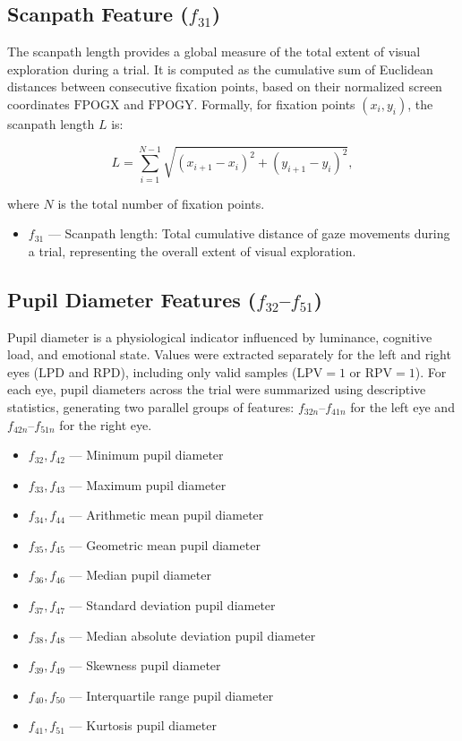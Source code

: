 \documentclass[12pt]{report}
\begin{document}
\subsection[Scanpath Feature (f31)]{Scanpath Feature (\(f_{31}\))}

The scanpath length provides a global measure of the total extent of visual exploration during a trial. 
It is computed as the cumulative sum of Euclidean distances between consecutive fixation points, based on their normalized screen coordinates \(\mathrm{FPOGX}\) and \(\mathrm{FPOGY}\). 
Formally, for fixation points \((x_i, y_i)\), the scanpath length \(L\) is:

\[
L = \sum_{i=1}^{N-1} \sqrt{(x_{i+1} - x_i)^2 + (y_{i+1} - y_i)^2},
\]

where \(N\) is the total number of fixation points. 

\begin{itemize}
    \item \(f_{31}\) — Scanpath length: Total cumulative distance of gaze movements during a trial, representing the overall extent of visual exploration.
\end{itemize}


\subsection[Pupil Diameter Features (f32–f51)]{Pupil Diameter Features (\(f_{32}\)–\(f_{51}\))}

Pupil diameter is a physiological indicator influenced by luminance, cognitive load, and emotional state. 
Values were extracted separately for the left and right eyes (\(\mathrm{LPD}\) and \(\mathrm{RPD}\)), including only valid samples (\(\mathrm{LPV} = 1\) or \(\mathrm{RPV} = 1\)). 
For each eye, pupil diameters across the trial were summarized using descriptive statistics, generating two parallel groups of features: \(f_{32n}\)--\(f_{41n}\) for the left eye and \(f_{42n}\)--\(f_{51n}\) for the right eye.

\begin{itemize}
    \item \(f_{32}, f_{42}\) — Minimum pupil diameter
    \item \(f_{33}, f_{43}\) — Maximum pupil diameter
    \item \(f_{34}, f_{44}\) — Arithmetic mean pupil diameter
    \item \(f_{35}, f_{45}\) — Geometric mean pupil diameter
    \item \(f_{36}, f_{46}\) — Median pupil diameter
    \item \(f_{37}, f_{47}\) — Standard deviation pupil diameter
    \item \(f_{38}, f_{48}\) — Median absolute deviation pupil diameter
    \item \(f_{39}, f_{49}\) — Skewness pupil diameter
    \item \(f_{40}, f_{50}\) — Interquartile range pupil diameter
    \item \(f_{41}, f_{51}\) — Kurtosis pupil diameter
\end{itemize}
\end{document}
